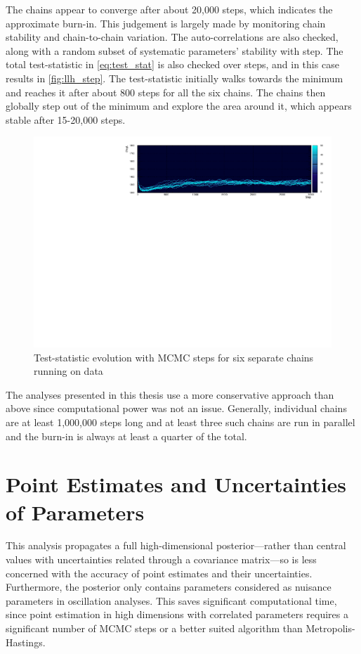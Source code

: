 The chains appear to converge after about 20,000 steps, which indicates the approximate burn-in. This judgement is largely made by monitoring chain stability and chain-to-chain variation. The auto-correlations are also checked, along with a random subset of systematic parameters' stability with step. The total test-statistic in \autoref{eq:test_stat} is also checked over steps, and in this case results in \autoref{fig:llh_step}. The test-statistic initially walks towards the minimum and reaches it after about 800 steps for all the six chains. The chains then globally step out of the minimum and explore the area around it, which appears stable after 15-20,000 steps.
\begin{figure}[h]
	\includegraphics[width=\textwidth, trim={0mm 0mm 0mm 0mm}, clip,page=1]{figures/mcmc/logl_step0}
	\caption{Test-statistic evolution with MCMC steps for six separate chains running on data}
	\label{fig:llh_step}
\end{figure}

The analyses presented in this thesis use a more conservative approach than above since computational power was not an issue. Generally, individual chains are at least 1,000,000 steps long and at least three such chains are run in parallel and the burn-in is always at least a quarter of the total.

\section{Point Estimates and Uncertainties of Parameters}
This analysis propagates a full high-dimensional posterior---rather than central values with uncertainties related through a covariance matrix---so is less concerned with the accuracy of point estimates and their uncertainties. Furthermore, the posterior only contains parameters considered as nuisance parameters in oscillation analyses. This saves significant computational time, since point estimation in high dimensions with correlated parameters requires a significant number of MCMC steps or a better suited algorithm than Metropolis-Hastings.

